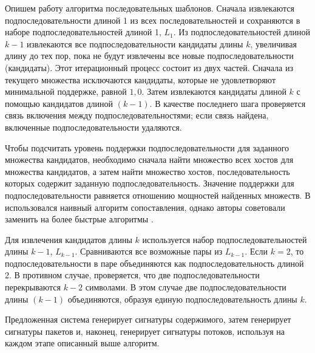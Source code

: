 Опишем работу алгоритма последовательных шаблонов.
Сначала извлекаются подпоследовательности длиной 1 из всех последовательностей и сохраняются в наборе подпоследовательностей длиной 1, $L_1$.
Из подпоследовательностей длиной $k-1$ извлекаются все подпоследовательности кандидаты длины $k$,
увеличивая длину до тех пор, пока не будут извлечены все новые подпоследовательности (кандидаты).
Этот итерационный процесс состоит из двух частей.
Сначала из текущего множества исключаются кандидаты, которые не удовлетворяют минимальной поддержке, равной $1,0$.
Затем извлекаются кандидаты длиной $k$ с помощью кандидатов длиной $(k-1)$.
В качестве последнего шага проверяется связь включения между подпоследовательностями; если связь найдена, включенные подпоследовательности удаляются.

Чтобы подсчитать уровень поддержки подпоследовательности для заданного множества кандидатов, необходимо сначала найти множество всех хостов для
множества кандидатов, а затем найти множество хостов, последовательность которых содержит заданную подпоследовательность.
Значение поддержки для подпоследовательности равняется отношению мощностей найденных множеств.
В \cite{shim2017sigbox} использовался наивный алгоритм сопоставления, однако авторы советовали заменить на более быстрые алгоритмы
\cite{karp1987efficient,boyer1977fast,xie2010improved,zhou2019research}.

Для извлечения кандидатов длины $k$ используется набор подпоследовательностей длины $k-1$, $L_{k-1}$.
Сравниваются все возможные пары из $L_{k-1}$.
Если $k = 2$, то подпоследовательности в паре объединяются как подпоследовательность длиной 2.
В противном случае, проверяется, что две подпоследовательности перекрываются $k-2$ символами.
В этом случае две подпоследовательности длины $(k-1)$ объединяются, образуя единую подпоследовательность длины $k$.

Предложенная система генерирует сигнатуры содержимого, затем генерирует сигнатуры пакетов и, наконец, генерирует сигнатуры потоков, используя на каждом этапе описанный выше алгоритм.

\newpage
